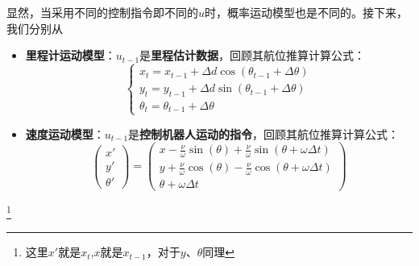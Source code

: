 \documentclass[../main.tex]{subfiles}
\begin{document}
        显然，当采用不同的控制指令即不同的$u$时，概率运动模型也是不同的。接下来，我们分别从
        \begin{itemize}
            \item \textbf{里程计运动模型}：$u_{t-1}$是\textbf{里程估计数据}，回顾其航位推算计算公式：
            $$\begin{cases}x_t=x_{t-1}+\Delta d\cos(\theta_{t-1}+\Delta\theta)\\y_t=y_{t-1}+\Delta d\sin(\theta_{t-1}+\Delta\theta)\\\theta_t=\theta_{t-1}+\Delta\theta\end{cases}$$
            \item \textbf{速度运动模型}：$u_{t-1}$是\textbf{控制机器人运动的指令}，回顾其航位推算计算公式：
            $$\left.\left(\begin{array}{c}x'\\y'\\\theta'\end{array}\right.\right)=\left(\begin{array}{c}x-\frac{\nu}{\omega}\sin(\theta)+\frac{\nu}{\omega}\sin(\theta+\omega\Delta t)\\y+\frac{\nu}{\omega}\cos(\theta)-\frac{\nu}{\omega}\cos(\theta+\omega\Delta t)\\\theta+\omega\Delta t\end{array}\right)$$
        \end{itemize}\footnote{这里$x'$就是$x_{t}$,$x$就是$x_{t-1}$，对于$y、\theta$同理}
\end{document}
